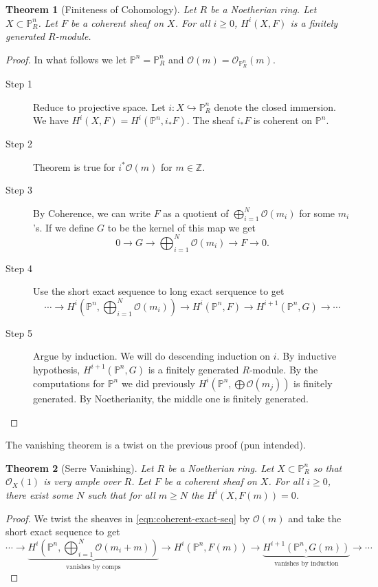 \documentclass[12pt]{article}
\numberwithin{equation}{section}
\newtheorem{theorem}{Theorem}[subsection]
\theoremstyle{definition}
\theoremstyle{remark}
\newcommand{\ZZ}{\mathbb{Z}}
\newcommand{\Ocal}{\mathcal{O}}
\newcommand{\PP}{\mathbb{P}}
\begin{document}
\begin{theorem}[Finiteness of Cohomology]
	Let $R$ be a Noetherian ring.
	Let $X \subset \PP^n_R$. 
	Let $F$ be a coherent sheaf on $X$. 
	For all $i\geq 0$, $H^i(X,F)$ is a finitely generated $R$-module.
\end{theorem}
\begin{proof}
	In what follows we let $\PP^n=\PP^n_R$ and $\Ocal(m) = \Ocal_{\PP^n_R}(m)$.
	\begin{description}
		\item[Step 1] Reduce to projective space. Let $i:X \hookrightarrow \PP^n_R$ denote the closed immersion. We have $H^i(X,F)=H^i(\PP^n,i_*F)$.
		The sheaf $i_*F$ is coherent on $\PP^n$.
		\item[Step 2] Theorem is true for $i^*\Ocal(m)$ for $m\in \ZZ$. 
		\item[Step 3] By Coherence, we can write $F$ as a quotient of $\bigoplus_{i=1}^N\Ocal(m_i)$ for some $m_i$'s. If we define $G$ to be the kernel of this map we get 
		\begin{equation}\label{eqn:coherent-exact-seq}
		0 \to G \to \bigoplus_{i=1}^N \Ocal(m_i) \to F \to 0.
		\end{equation}
		\item[Step 4] Use the short exact sequence to long exact serquence to get 
		$$\cdots \to  H^i(\PP^n, \bigoplus_{i=1}^N \Ocal(m_i) ) \to H^i(\PP^n,F) \to H^{i+1}(\PP^n,G) \to \cdots $$
		\item[Step 5] Argue by induction. 
		We will do descending induction on $i$. 
		By inductive hypothesis, $H^{i+1}(\PP^n,G)$ is a finitely generated $R$-module.
		By the computations for $\PP^n$ we did previously $H^i(\PP^n, \bigoplus \Ocal(m_j))$ is finitely generated. 
		By Noetherianity, the middle one is finitely generated.
	\end{description}
\end{proof}
The vanishing theorem is a twist on the previous proof (pun intended). 
\begin{theorem}[Serre Vanishing]
	Let $R$ be a Noetherian ring.
	Let $X \subset \PP^n_R$ so that $\Ocal_X(1)$ is very ample over $R$. 
	Let $F$ be a coherent sheaf on $X$. 
	For all $i\geq 0$, there exist some $N$ such that for all $m\geq N$ the $H^i(X,F(m))=0$.
\end{theorem}
\begin{proof}
	We twist the sheaves in \eqref{eqn:coherent-exact-seq} by $\Ocal(m)$ and take the short exact sequence to get
	$$\cdots \to  \underbrace{H^i(\PP^n, \bigoplus_{i=1}^N \Ocal(m_i+m) )}_{\mbox{vanishes by comps}} \to H^i(\PP^n,F(m)) \to \underbrace{H^{i+1}(\PP^n,G(m))}_{\mbox{vanishes by induction}} \to \cdots $$
\end{proof}
\end{document}
